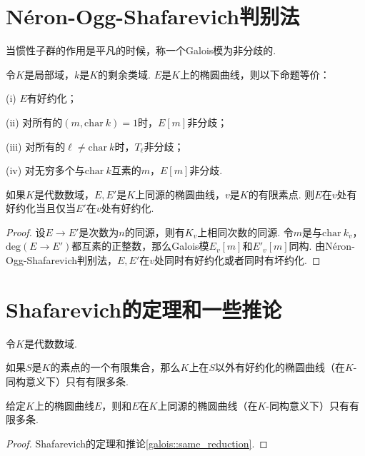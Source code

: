 \section{Néron-Ogg-Shafarevich判别法}

当惯性子群的作用是平凡的时候，称一个Galois模为非分歧的.

\begin{cthm}
    令$K$是局部域，$k$是$K$的剩余类域.  $E$是$K$上的椭圆曲线，则以下命题等价：

    (i) $E$有好约化；

    (ii) 对所有的$(m, \mathrm{char}\ k)=1$时，$E[m]$非分歧；

    (iii) 对所有的$\ell\neq \mathrm{char}\ k$时，$T_{\ell}$非分歧；

    (iv) 对无穷多个与$\mathrm{char}\ k$互素的$m$，$E[m]$非分歧.
\end{cthm}

\begin{ccor}
    如果$K$是代数数域，$E, E'$是$K$上同源的椭圆曲线，$v$是$K$的有限素点. 则$E$在$v$处有好约化当且仅当$E'$在$v$处有好约化. \label{galois::same_reduction}
\end{ccor}

\begin{proof}
    设$E\to E'$是次数为$n$的同源，则有$K_v$上相同次数的同源. 令$m$是与$\mathrm{char}\ k_v$，$\mathrm{deg}(E\to E')$都互素的正整数，那么Galois模$E_v[m]$和$E'_v[m]$同构. 由Néron-Ogg-Shafarevich判别法，$E, E'$在$v$处同时有好约化或者同时有坏约化.
\end{proof}


\section{Shafarevich的定理和一些推论}

令$K$是代数数域.

\begin{cthm}[Shafarevich]
    如果$S$是$K$的素点的一个有限集合，那么$K$上在$S$以外有好约化的椭圆曲线（在$K$-同构意义下）只有有限多条.
\end{cthm}

\begin{ccor}
    给定$K$上的椭圆曲线$E$，则和$E$在$K$上同源的椭圆曲线（在$K$-同构意义下）只有有限多条.\label{galois::isogeny_finite_curves}
\end{ccor}

\begin{proof}
    Shafarevich的定理和推论\ref{galois::same_reduction}.
\end{proof}
